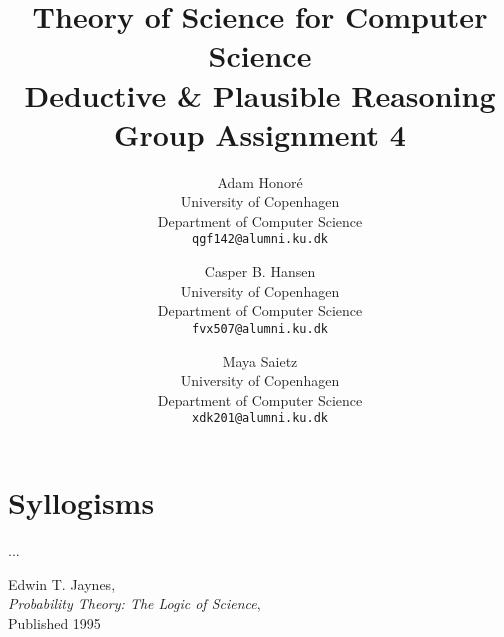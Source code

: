 \documentclass[11pt]{article}
\title
{
	{\large Theory of Science for Computer Science}\\
	Deductive \& Plausible Reasoning\\
	{\Large Group Assignment 4}
	\vspace{0.25in}
}
\author
{
	Adam Honoré\\
	University of Copenhagen\\
	Department of Computer Science\\
	{\tt qgf142@alumni.ku.dk}
	\and
	Casper B. Hansen\\
	University of Copenhagen\\
	Department of Computer Science\\
	{\tt fvx507@alumni.ku.dk}
	\and
	Maya Saietz\\
	University of Copenhagen\\
	Department of Computer Science\\
	{\tt xdk201@alumni.ku.dk}
}
\begin{document}
\clearpage
\maketitle
\thispagestyle{empty}

\section{Syllogisms}
...

\newpage
\begin{thebibliography}{9}
	
	Edwin T. Jaynes,\\
	\emph{Probability Theory: The Logic of Science},\\
	Published 1995

\end{thebibliography}
\end{document}
